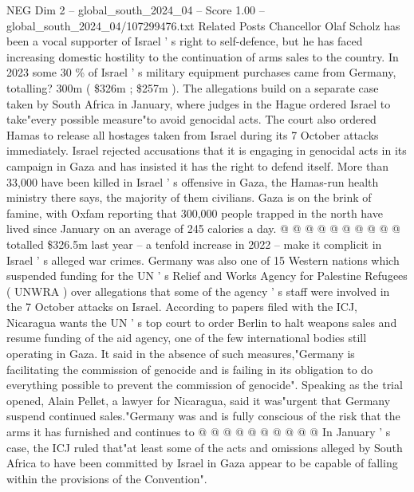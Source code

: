 \begin{textsample}{NEG Dim 2 – global\_south\_2024\_04 – Score 1.00 – global\_south\_2024\_04/107299476.txt}  \label{ex:f2_neg_402}
Related Posts Chancellor Olaf Scholz has been a vocal supporter of Israel ' s right to self-defence, but he has faced increasing domestic hostility to the continuation of arms sales to the country.
In 2023 some 30 \% of Israel ' s military equipment purchases came from Germany, totalling? 300m ( \$326m ; \$257m ).
The allegations build on a separate case taken by South Africa in January, where judges in the Hague ordered Israel to take"every possible measure"to avoid genocidal acts.
The court also ordered Hamas to release all hostages taken from Israel during its 7 October attacks immediately.
Israel rejected accusations that it is engaging in genocidal acts in its campaign in Gaza and has insisted it has the right to defend itself.
More than 33,000 have been killed in Israel ' s offensive in Gaza, the Hamas-run health ministry there says, the majority of them civilians.
Gaza is on the brink of famine, with Oxfam reporting that 300,000 people trapped in the north have lived since January on an average of 245 calories a day. @ @ @ @ @ @ @ @ @ @ totalled \$326.5m last year -- a tenfold increase in 2022 -- make it complicit in Israel ' s alleged war crimes.
Germany was also one of 15 Western nations which suspended funding for the UN ' s Relief and Works Agency for Palestine Refugees ( UNWRA ) over allegations that some of the agency ' s staff were involved in the 7 October attacks on Israel.
According to papers filed with the ICJ, Nicaragua wants the UN ' s top court to order Berlin to halt weapons sales and resume funding of the aid agency, one of the few international bodies still operating in Gaza.
It said in the absence of such measures,"Germany is facilitating the commission of genocide and is failing in its obligation to do everything possible to prevent the commission of genocide".
Speaking as the trial opened, Alain Pellet, a lawyer for Nicaragua, said it was"urgent that Germany suspend continued sales."Germany was and is fully conscious of the risk that the arms it has furnished and continues to @ @ @ @ @ @ @ @ @ @ In January ' s case, the ICJ ruled that"at least some of the acts and omissions alleged by South Africa to have been committed by Israel in Gaza appear to be capable of falling within the provisions of the Convention".

\end{textsample}
